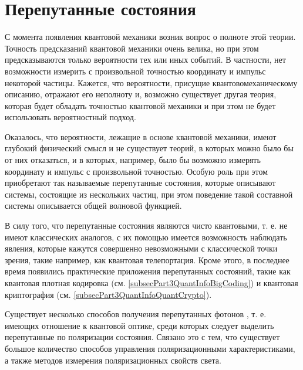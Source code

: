 \chapter{Перепутанные состояния}
\label{subsecPart3NonclassEntangl}

С момента появления квантовой механики возник вопрос о полноте
этой теории. Точность предсказаний квантовой механики очень велика, но
при этом 
предсказываются только вероятности тех или иных событий. В частности,
нет возможности измерить с произвольной точностью координату и
импульс некоторой частицы. Кажется, что
вероятности, присущие квантовомеханическому описанию, отражают его
неполноту и, возможно существует другая теория, которая будет обладать
точностью квантовой механики и при этом не будет использовать
вероятностный подход.

Оказалось, что вероятности, лежащие в основе квантовой механики, имеют
глубокий физический смысл и не существует теорий, в которых 
можно было бы от них отказаться, и в которых, например, было бы
возможно измерять координату и импульс с произвольной точностью. 
Особую роль при этом приобретают так называемые перепутанные
состояния, которые описывают системы, состоящие из нескольких частиц,
при этом поведение такой составной системы описывается общей волновой
функцией. 

В силу того, что перепутанные состояния являются чисто квантовыми,
т. е. не имеют классических аналогов, с их помощью имеется
возможность наблюдать явления, которые кажутся совершенно
невозможными с классической точки зрения, такие например, как квантовая
телепортация. Кроме этого, в последнее время появились практические
приложения перепутанных состояний, такие как квантовая плотная
кодировка 
(см. \ref{subsecPart3QuantInfoBigCoding})
и квантовая криптография
(см. \ref{subsecPart3QuantInfoQuantCrypto}).

Существует несколько способов получения перепутанных фотонов
\cite{bPhisQuantInfo}, т. е. имеющих отношение к квантовой оптике,
среди которых следует выделить перепутанные по поляризации
состояния. Связано это с тем, что существует большое количество
способов управления поляризационными характеристиками, а также
методов измерения поляризационных свойств света.


